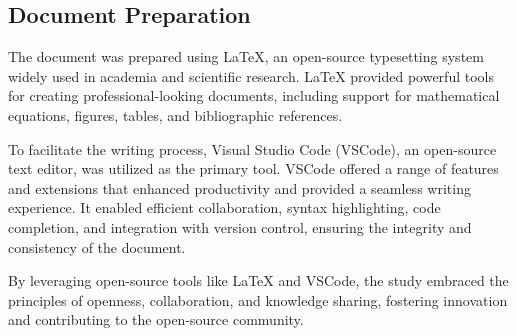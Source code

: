 \documentclass[../main.tex]{subfiles}
\begin{document}
    \subsection{Document Preparation}

    The document was prepared using LaTeX, an open-source typesetting system widely used in academia and scientific research. LaTeX provided powerful tools for creating professional-looking documents, including support for mathematical equations, figures, tables, and bibliographic references.

    To facilitate the writing process, Visual Studio Code (VSCode), an open-source text editor, was utilized as the primary tool. VSCode offered a range of features and extensions that enhanced productivity and provided a seamless writing experience. It enabled efficient collaboration, syntax highlighting, code completion, and integration with version control, ensuring the integrity and consistency of the document.

    By leveraging open-source tools like LaTeX and VSCode, the study embraced the principles of openness, collaboration, and knowledge sharing, fostering innovation and contributing to the open-source community.
\end{document}
